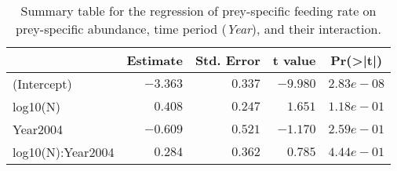 \begin{table}[!htbp]
\caption{Summary table for the regression of prey-specific feeding rate 
  on prey-specific abundance,
  time period (\emph{Year}), 
  and their interaction.\label{tab:FNYint}} 
\begin{center}
\begin{tabular}{lrrrr}
\hline
\multicolumn{1}{l}{}&\multicolumn{1}{c}{Estimate}&\multicolumn{1}{c}{Std. Error}&\multicolumn{1}{c}{t value}&\multicolumn{1}{c}{Pr(\textgreater |t|)}\tabularnewline
\hline
(Intercept)&$-3.363$&$0.337$&$-9.980$&$2.83e-08$\tabularnewline
log10(N)&$ 0.408$&$0.247$&$ 1.651$&$1.18e-01$\tabularnewline
Year2004&$-0.609$&$0.521$&$-1.170$&$2.59e-01$\tabularnewline
log10(N):Year2004&$ 0.284$&$0.362$&$ 0.785$&$4.44e-01$\tabularnewline
\hline
\end{tabular}\end{center}
\end{table}
